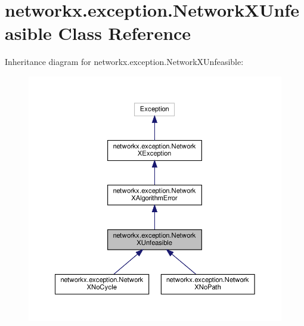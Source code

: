 \hypertarget{classnetworkx_1_1exception_1_1NetworkXUnfeasible}{}\section{networkx.\+exception.\+Network\+X\+Unfeasible Class Reference}
\label{classnetworkx_1_1exception_1_1NetworkXUnfeasible}


Inheritance diagram for networkx.\+exception.\+Network\+X\+Unfeasible\+:
\nopagebreak
\begin{figure}[H]
\begin{center}
\leavevmode
\includegraphics[width=350pt]{classnetworkx_1_1exception_1_1NetworkXUnfeasible__inherit__graph}
\end{center}
\end{figure}


